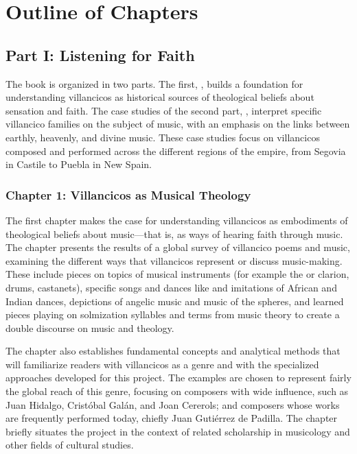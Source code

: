 \documentclass{vcbook-proposal}
\begin{document}
\section{Outline of Chapters}

\subsection{Part I: Listening for Faith}

The book is organized in two parts.
The first, , builds a foundation for 
understanding villancicos as historical sources of theological beliefs about 
sensation and faith.
The case studies of the second part, , interpret specific villancico families on the subject of music, with an 
emphasis on the links between earthly, heavenly, and divine music.
These case studies focus on villancicos composed and performed across the
different regions of the empire, from Segovia in Castile to Puebla in New Spain.

\subsubsection{Chapter 1: Villancicos as Musical Theology}

The first chapter makes the case for understanding villancicos as embodiments 
of theological beliefs about music---that is, as ways of hearing faith through 
music.
The chapter presents the results of a global survey of villancico poems and 
music, examining the different ways that villancicos represent or discuss 
music-making.
These include pieces on topics of musical instruments (for example the 
 or clarion, drums, castanets), specific songs and dances like 
 and imitations of African and Indian dances, depictions of 
angelic music and music of the spheres, and learned pieces playing on 
solmization syllables and terms from music theory to create a double discourse 
on music and theology.

The chapter also establishes fundamental concepts and analytical methods that 
will familiarize readers with villancicos as a genre and with the specialized 
approaches developed for this project.
The examples are chosen to represent fairly the global reach of this genre, 
focusing on composers with wide influence, such as Juan Hidalgo, Cristóbal 
Galán, and Joan Cererols; and composers whose works are frequently performed 
today, chiefly Juan Gutiérrez de Padilla.
The chapter briefly situates the project in the context of related scholarship
in musicology and other fields of cultural studies.
\end{document}
